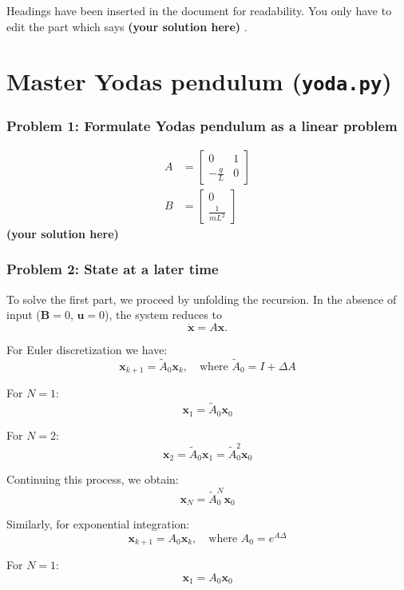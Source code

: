 \documentclass[12pt,twoside]{article}
\newcommand\redt[1]{ {\textcolor[rgb]{0.60, 0.00, 0.00}{\textbf{ #1} } } }
\newcommand{\yoursolution}{ \redt{(your solution here) } }
\begin{document}
Headings have been inserted in the document for readability. You only have to edit the part which says \yoursolution. 

\section{Master Yodas pendulum (\texttt{yoda.py})}\label{yoda1}
\subsubsection*{{\color{red}Problem 1:  Formulate Yodas pendulum as a linear problem}}
	
\begin{align}
	A & = \begin{bmatrix}
	0 & 1 \\
	-\frac{g}{L} & 0
	\end{bmatrix} \\
	B & = \begin{bmatrix}
	0 \\
	\frac{1}{mL^2}
	\end{bmatrix}
\end{align}
	\yoursolution 	
	
\subsubsection*{{\color{red}Problem 2:  State at a later time}}
To solve the first part, we proceed by unfolding the recursion. In the absence of input ($\mathbf{B} = 0$, $\mathbf{u} = 0$), the system reduces to
\[
\dot{\mathbf{x}} = A \mathbf{x}.
\]

For Euler discretization we have:
\[
\mathbf{x}_{k+1} = \tilde{A}_0 \mathbf{x}_k, \quad \text{where } \tilde{A}_0 = I + \Delta A
\]

For $N=1$:
\[
\mathbf{x}_1 = \tilde{A}_0 \mathbf{x}_0
\]

For $N=2$:
\[
\mathbf{x}_2 = \tilde{A}_0 \mathbf{x}_1 = \tilde{A}_0^2 \mathbf{x}_0
\]

Continuing this process, we obtain:
\[
\mathbf{x}_N = \tilde{A}_0^N \mathbf{x}_0
\]

Similarly, for exponential integration:
\[
\mathbf{x}_{k+1} = A_0 \mathbf{x}_k, \quad \text{where } A_0 = e^{A\Delta}
\]

For $N=1$:
\[
\mathbf{x}_1 = A_0 \mathbf{x}_0
\]
\end{document}
